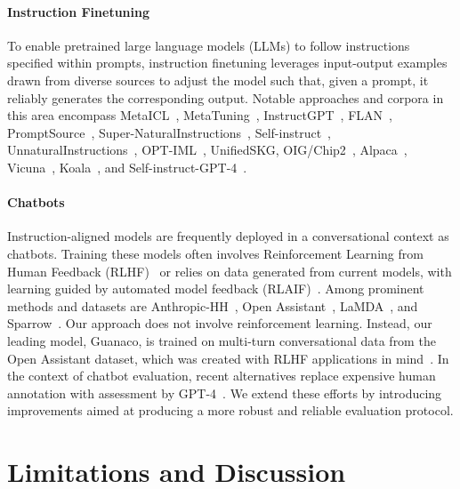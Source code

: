\paragraph{Instruction Finetuning} To enable pretrained large language models (LLMs) to follow instructions specified within prompts, instruction finetuning leverages input-output examples drawn from diverse sources to adjust the model such that, given a prompt, it reliably generates the corresponding output. Notable approaches and corpora in this area encompass MetaICL~\citep{min2021metaicl}, MetaTuning~\citep{zhong2021adapting}, InstructGPT~\citep{ouyang2022training}, FLAN~\citep{wei2021finetuned,chung2022scaling}, PromptSource~\citep{bach2022promptsource}, Super-NaturalInstructions~\citep{wang2022super,sanh2021multitask}, Self-instruct~\citep{wang2022self}, UnnaturalInstructions~\citep{honovich2022unnatural}, OPT-IML~\citep{iyer2022opt}, UnifiedSKG\citep{xie2022unifiedskg}, OIG/Chip2~\citep{laion2023}, Alpaca~\citep{alpaca}, Vicuna~\citep{vicuna2023}, Koala~\citep{koala_blogpost_2023}, and Self-instruct-GPT-4~\citep{peng2023instruction}.

\paragraph{Chatbots} Instruction-aligned models are frequently deployed in a conversational context as chatbots. Training these models often involves Reinforcement Learning from Human Feedback (RLHF)~\citep{christiano2017deep} or relies on data generated from current models, with learning guided by automated model feedback (RLAIF)~\citep{bai2022constitutional}. Among prominent methods and datasets are Anthropic-HH~\citep{askell2021general,bai2022training}, Open Assistant~\citep{kopf2023openassistant}, LaMDA~\citep{thoppilan2022lamda}, and Sparrow~\citep{glaese2022improving}. Our approach does not involve reinforcement learning. Instead, our leading model, Guanaco, is trained on multi-turn conversational data from the Open Assistant dataset, which was created with RLHF applications in mind~\citep{kopf2023openassistant}. In the context of chatbot evaluation, recent alternatives replace expensive human annotation with assessment by GPT-4~\citep{vicuna2023,peng2023instruction}. We extend these efforts by introducing improvements aimed at producing a more robust and reliable evaluation protocol.

\section{Limitations and Discussion}

